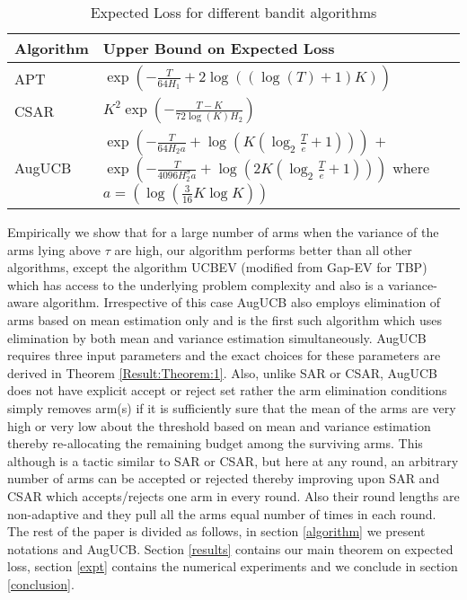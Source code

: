 \begin{table}[!h]
\caption{Expected Loss for different bandit algorithms}
\label{tab:regret-bds}
\begin{center}
\begin{tabular}{|p{1.3cm}|p{6.33cm}|}
\toprule
Algorithm  & Upper Bound on Expected Loss \\
\midrule
APT         &$\exp(-\frac{T}{64H_1}+2\log((\log(T)+1)K))$ \\\midrule
CSAR		&$K^2\exp(-\frac{T-K}{72\log(K)H_2})$ \\\midrule
AugUCB      &
$\exp\left( -\frac{T}{ 64 H_2 a} + \log\left(K\left(\log_2\frac{T}{e}+1\right)\right)\right)$\newline
 $+$ \newline  
 $ \exp\left(- \frac{T}{4096 H_{2}^{\sigma} a}
 + \log\left(2K\left(\log_2\frac{T}{e}+1\right)\right) \right) $\newline
 where $a=(\log(\frac{3}{16} K\log K))$
\\\bottomrule
\end{tabular}
\end{center}
\end{table}
Empirically we show that for a large number of arms when the variance of the arms lying above $\tau$ are high, our algorithm performs better than all other algorithms, except the algorithm UCBEV (modified from Gap-EV for TBP) which has access to the underlying problem complexity and also is a variance-aware algorithm. Irrespective of this case AugUCB also employs elimination of arms based on mean estimation only and is the first such algorithm which uses elimination by both mean and variance estimation simultaneously. AugUCB requires three input parameters and the exact choices for these parameters are derived in Theorem \ref{Result:Theorem:1}. Also, unlike SAR or CSAR, AugUCB does not have explicit accept or reject set rather the arm elimination conditions simply removes arm(s) if it is sufficiently sure that the mean of the arms are very high or very low about the threshold based on mean and variance estimation thereby re-allocating the remaining budget among the surviving arms. This although is a tactic similar to SAR or CSAR, but here at any round, an arbitrary number of arms can be accepted or rejected thereby improving upon SAR and CSAR which accepts/rejects one arm in every round. Also their round lengths are non-adaptive and they pull all the arms equal number of times in each round. 
The rest of the paper is divided as follows, in section \ref{algorithm} we present notations and AugUCB. 
Section \ref{results} contains our main theorem on expected loss, section \ref{expt} contains the numerical experiments and we conclude in section \ref{conclusion}.


  